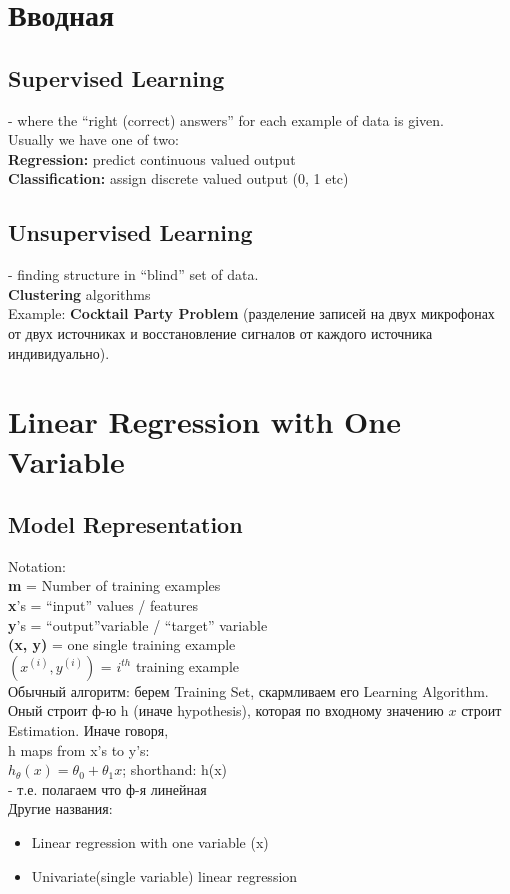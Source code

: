 \documentclass{scrartcl}
\begin{document}
\label{Chapter 1}
\section {Вводная}
\subsection* {Supervised Learning} - where the ``right (correct)
answers'' for
each example of data is given. \\
Usually we have one of two:\\
{\bf Regression:} predict continuous valued output \\
{\bf Classification:} assign discrete valued output (0, 1 etc) \\

\subsection* {Unsupervised Learning} - finding structure in ``blind''
set of
data. \\
{\bf Clustering} algorithms  \\
Example: {\bf Cocktail Party Problem} (разделение записей на двух
микрофонах от двух источниках и восстановление сигналов от каждого
источника
индивидуально). \\

\label{Chapter 2}
\section {Linear Regression with One Variable}

\subsection {Model Representation}
Notation: \\
{\bf m} =  Number of training examples \\
{\bf x}'s = ``input'' values / features \\
{\bf y}'s = ``output''variable / ``target'' variable \\
{\bf (x, y)} = one single training example \\
{\bf $(x^{(i)}, y^{(i)})$} = $i^{th}$ training example \\

Обычный алгоритм: берем Training Set, скармливаем его Learning
Algorithm. Оный строит ф-ю h (иначе hypothesis), которая по входному
значению $x$ строит Estimation. Иначе говоря, \\
h maps from x's to y's: \\
$h_\theta(x)=\theta_0 + \theta_1x$; shorthand: h(x) \\
- т.е. полагаем что ф-я линейная \\
Другие названия:
\begin{itemize}
\item Linear regression with one variable (x)
\item Univariate(single variable) linear regression
\end{itemize}
\end{document}
